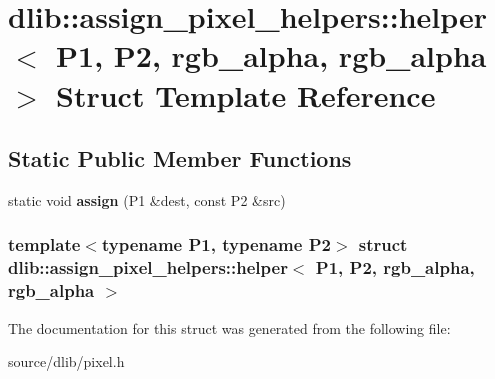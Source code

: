 \hypertarget{structdlib_1_1assign__pixel__helpers_1_1helper_3_01P1_00_01P2_00_01rgb__alpha_00_01rgb__alpha_01_4}{
\section{dlib::assign\_\-pixel\_\-helpers::helper$<$ P1, P2, rgb\_\-alpha, rgb\_\-alpha $>$ Struct Template Reference}
\label{structdlib_1_1assign__pixel__helpers_1_1helper_3_01P1_00_01P2_00_01rgb__alpha_00_01rgb__alpha_01_4}
}
\subsection*{Static Public Member Functions}
\begin{DoxyCompactItemize}
\item 
\hypertarget{structdlib_1_1assign__pixel__helpers_1_1helper_3_01P1_00_01P2_00_01rgb__alpha_00_01rgb__alpha_01_4_aeb8edd2af51889ee0f6562f85f3a9b68}{
static void {\bfseries assign} (P1 \&dest, const P2 \&src)}
\label{structdlib_1_1assign__pixel__helpers_1_1helper_3_01P1_00_01P2_00_01rgb__alpha_00_01rgb__alpha_01_4_aeb8edd2af51889ee0f6562f85f3a9b68}

\end{DoxyCompactItemize}
\subsubsection*{template$<$typename P1, typename P2$>$ struct dlib::assign\_\-pixel\_\-helpers::helper$<$ P1, P2, rgb\_\-alpha, rgb\_\-alpha $>$}



The documentation for this struct was generated from the following file:\begin{DoxyCompactItemize}
\item 
source/dlib/pixel.h\end{DoxyCompactItemize}
